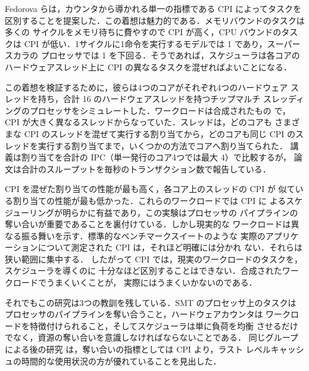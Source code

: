 \documentclass[../main.tex]{subfiles}
\begin{document}
Fedorova らは，カウンタから導かれる単一の指標である CPI によってタスクを
区別することを提案した．この着想は魅力的である．メモリバウンドのタスクは多くの
サイクルをメモリ待ちに費やすので CPI が高く，CPU バウンドのタスクは CPI
が低い．1サイクルに1命令を実行するモデルでは 1 であり，スーパースカラの
プロセッサでは 1 を下回る．そうであれば，スケジューラは各コアの
ハードウェアスレッド上に CPI の異なるタスクを混ぜればよいことになる．

この着想を検証するために，彼らは4つのコアがそれぞれ4つのハードウェア
スレッドを持ち，合計 16 のハードウェアスレッドを持つチップマルチ
スレッディングのプロセッサをシミュレートした．ワークロードは合成されたもの
で，CPI が大きく異なるスレッドからなっていた．スレッドは，どのコアも
さまざまな CPI のスレッドを混ぜて実行する割り当てから，どのコアも同じ CPI
のスレッドを実行する割り当てまで，いくつかの方法でコアへ割り当てられた．
講義は割り当てを合計の IPC（単一発行のコア4つでは最大 4）で比較するが，
論文は合計のスループットを毎秒のトランザクション数で報告している．

CPI を混ぜた割り当ての性能が最も高く，各コア上のスレッドの CPI が
似ている割り当ての性能が最も低かった．これらのワークロードでは CPI に
よるスケジューリングが明らかに有益であり，この実験はプロセッサの
パイプラインの奪い合いが重要であることを裏付けている．しかし現実的な
ワークロードは異なる振る舞いを示す．標準的なベンチマークスイートのような
実際のアプリケーションについて測定された CPI は，それほど明確には分かれ
ない．それらは狭い範囲に集中する．
したがって CPI では，現実のワークロードのタスクを，スケジューラを導くのに
十分なほど区別することはできない．合成されたワークロードでうまくいくことが，
実際にはうまくいかないのである．

\begin{note}
  それでもこの研究は3つの教訓を残している．SMT のプロセッサ上のタスクは
  プロセッサのパイプラインを奪い合うこと，ハードウェアカウンタは
  ワークロードを特徴付けられること，そしてスケジューラは単に負荷を均衡
  させるだけでなく，資源の奪い合いを意識しなければならないことである．
  同じグループによる後の研究 \cite{fedorova2005} は，奪い合いの指標としては CPI より，ラスト
  レベルキャッシュの時間的な使用状況の方が優れていることを見出した．
\end{note}
\end{document}
